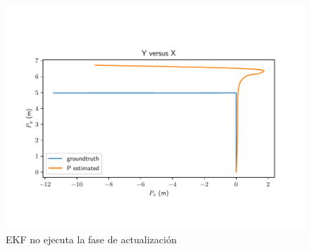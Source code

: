 \begin{figure}
\includegraphics[width=\textwidth]{estimador_px4/im_simu/tray_no_gps}
\caption{EKF no ejecuta la fase de actualización}
\label{fig:simu1}
\end{figure}

